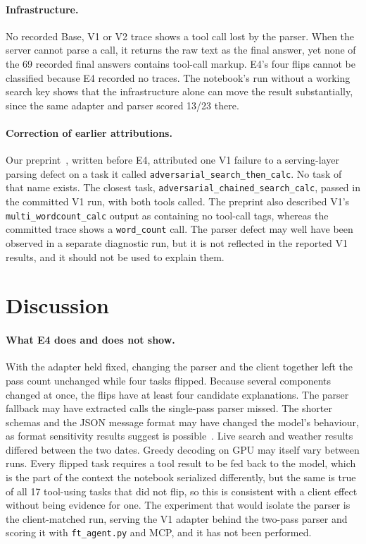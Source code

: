 \documentclass[runningheads]{llncs}
\begin{document}
\paragraph{Infrastructure.} No recorded Base, V1 or V2 trace shows a tool call lost by the parser. When the server cannot parse a call, it returns the raw text as the final answer, yet none of the 69 recorded final answers contains tool-call markup. E4's four flips cannot be classified because E4 recorded no traces. The notebook's run without a working search key shows that the infrastructure alone can move the result substantially, since the same adapter and parser scored 13/23 there.

\paragraph{Correction of earlier attributions.} Our preprint~\cite{l2026agentrunpreprint}, written before E4, attributed one V1 failure to a serving-layer parsing defect on a task it called \texttt{adversarial\_search\_then\_calc}. No task of that name exists. The closest task, \texttt{adversarial\_chained\_search\_calc}, passed in the committed V1 run, with both tools called. The preprint also described V1's \texttt{multi\_wordcount\_calc} output as containing no tool-call tags, whereas the committed trace shows a \texttt{word\_count} call. The parser defect may well have been observed in a separate diagnostic run, but it is not reflected in the reported V1 results, and it should not be used to explain them.

\section{Discussion}
\label{sec:discussion}

\paragraph{What E4 does and does not show.}
With the adapter held fixed, changing the parser and the client together left the pass count unchanged while four tasks flipped. Because several components changed at once, the flips have at least four candidate explanations. The parser fallback may have extracted calls the single-pass parser missed. The shorter schemas and the JSON message format may have changed the model's behaviour, as format sensitivity results suggest is possible~\cite{sclar2024formatting,tam2024speakfreely}. Live search and weather results differed between the two dates. Greedy decoding on GPU may itself vary between runs. Every flipped task requires a tool result to be fed back to the model, which is the part of the context the notebook serialized differently, but the same is true of all 17 tool-using tasks that did not flip, so this is consistent with a client effect without being evidence for one. The experiment that would isolate the parser is the client-matched run, serving the V1 adapter behind the two-pass parser and scoring it with \texttt{ft\_agent.py} and MCP, and it has not been performed.
\end{document}
